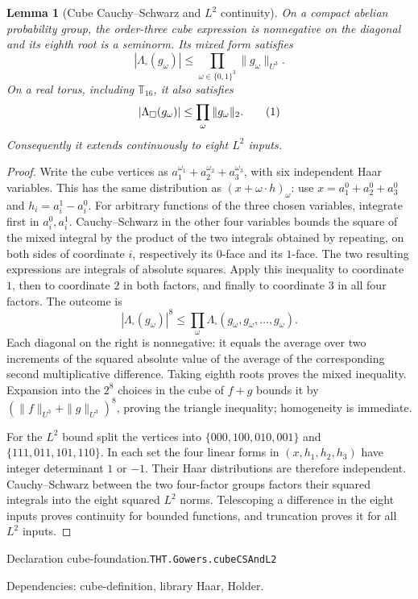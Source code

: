 \documentclass[11pt]{article}
\newtheorem{lemma}[theorem]{Lemma}
\theoremstyle{definition}
\newcommand{\T}{\mathbb T}
\newcommand{\eqtag}[1]{\refstepcounter{equation}\tag{\theequation}\label{#1}}
\numberwithin{equation}{section}
\newcommand{\bp}[3]{\par\smallskip\begingroup\footnotesize
\noindent\hypertarget{bp:#1}{\textsf{Declaration #1.}}\quad\nolinkurl{#2}\par
\noindent\textsf{Dependencies:} #3.\par\endgroup\smallskip}
\begin{document}
\begin{lemma}[Cube Cauchy--Schwarz and $L^2$ continuity]\label{lem:cube-foundation}
On a compact abelian probability group, the order-three cube expression is nonnegative on the diagonal and its eighth root is a seminorm. Its mixed form satisfies
\[
 |\Lambda_\square(g_\omega)|\le\prod_{\omega\in\{0,1\}^3}\|g_\omega\|_{U^3}.
\]
On a real torus, including $\T_{16}$, it also satisfies
\[
 |\Lambda_\square(g_\omega)|\le\prod_\omega\|g_\omega\|_2.
 \eqtag{eq:cube-L2}
\]
Consequently it extends continuously to eight $L^2$ inputs.
\end{lemma}
\begin{proof}
Write the cube vertices as $a_1^{\omega_1}+a_2^{\omega_2}+a_3^{\omega_3}$, with six independent Haar variables. This has the same distribution as $(x+\omega\cdot h)_\omega$: use $x=a_1^0+a_2^0+a_3^0$ and $h_i=a_i^1-a_i^0$. For arbitrary functions of the three chosen variables, integrate first in $a_i^0,a_i^1$. Cauchy--Schwarz in the other four variables bounds the square of the mixed integral by the product of the two integrals obtained by repeating, on both sides of coordinate $i$, respectively its $0$-face and its $1$-face. The two resulting expressions are integrals of absolute squares. Apply this inequality to coordinate $1$, then to coordinate $2$ in both factors, and finally to coordinate $3$ in all four factors. The outcome is
\[
 |\Lambda_\square(g_\omega)|^8
 \le\prod_\omega\Lambda_\square(g_\omega,g_\omega,\ldots,g_\omega).
\]
Each diagonal on the right is nonnegative: it equals the average over two increments of the squared absolute value of the average of the corresponding second multiplicative difference. Taking eighth roots proves the mixed inequality. Expansion into the $2^8$ choices in the cube of $f+g$ bounds it by $(\|f\|_{U^3}+\|g\|_{U^3})^8$, proving the triangle inequality; homogeneity is immediate.

For the $L^2$ bound split the vertices into $\{000,100,010,001\}$ and $\{111,011,101,110\}$. In each set the four linear forms in $(x,h_1,h_2,h_3)$ have integer determinant $1$ or $-1$. Their Haar distributions are therefore independent. Cauchy--Schwarz between the two four-factor groups factors their squared integrals into the eight squared $L^2$ norms. Telescoping a difference in the eight inputs proves continuity for bounded functions, and truncation proves it for all $L^2$ inputs.
\end{proof}
\bp{cube-foundation}{THT.Gowers.cubeCSAndL2}{cube-definition, library Haar, Holder}
\end{document}
